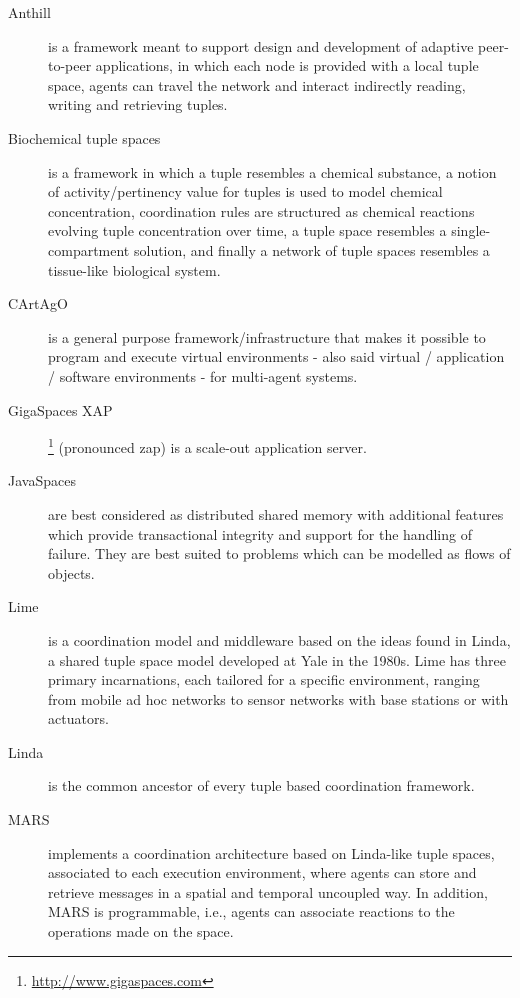 \documentclass[12pt,a4paper,twoside,openright]{book}
\begin{document}
\begin{description}
 \item[Anthill] \cite{anthill} is a framework meant to support design and development of adaptive peer-to-peer applications, in which each node is provided with a local tuple space, agents can travel the network and interact indirectly reading, writing and retrieving tuples.

 \item[Biochemical tuple spaces] \cite{biochemicalTupleSpaces} is a framework in which a tuple resembles a chemical substance, a notion of activity/pertinency value for tuples is used to model chemical concentration, coordination rules are structured as chemical reactions evolving tuple concentration over time, a tuple space resembles a single-compartment solution, and finally a network of tuple spaces resembles a tissue-like biological system.

 \item[CArtAgO] \cite{RPV-JAAMAS2011} is a general purpose framework/infrastructure that makes it possible to program and execute virtual environments - also said virtual / application / software environments - for multi-agent systems.

 \item[GigaSpaces XAP]\footnote{\url{http://www.gigaspaces.com}} (pronounced zap) is a scale-out application server.

 \item[JavaSpaces] \cite{javaspaces1999,javaspaces} are best considered as distributed shared memory with additional features which provide transactional integrity and support for the handling of failure. They are best suited to problems which can be modelled as flows of objects.

 \item[Lime] \cite{murphy2006lime} is a coordination model and middleware based on the ideas found in Linda, a shared tuple space model developed at Yale in the 1980s. Lime has three primary incarnations, each tailored for a specific environment, ranging from mobile ad hoc networks to sensor networks with base stations or with actuators.

 \item[Linda] \cite{linda-toplas7} is the common ancestor of every tuple based coordination framework.

 \item[MARS] \cite{mars} implements a coordination architecture based on Linda-like tuple spaces, associated to each execution environment, where agents can store and retrieve messages in a spatial and temporal uncoupled way.
 In addition, MARS is programmable, i.e., agents can associate reactions to the operations made on the space.


\end{description}
\end{document}
